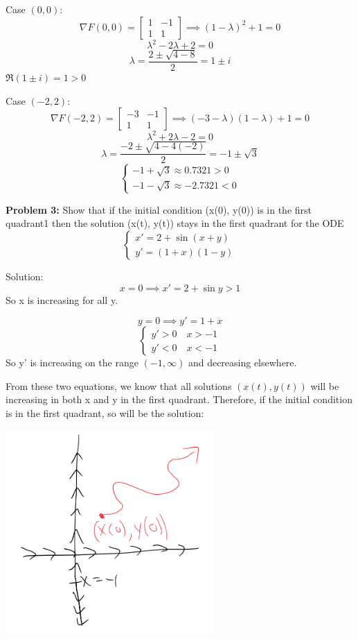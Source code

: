 \documentclass[12pt]{article}
\begin{document}
Case $(0, 0)$:
\[\nabla F(0, 0) = \begin{bmatrix}
    1 & -1\\
    1 & 1
\end{bmatrix} \implies (1- \lambda)^2 + 1 = 0\]
\[\lambda^2 - 2\lambda + 2 = 0\]
\[\lambda = \frac{2 \pm \sqrt{4 - 8}}{2} = 1 \pm i\]
$\Re (1 \pm i) = 1 > 0$ 

Case $(-2, 2)$:
\[\nabla F(-2, 2) = \begin{bmatrix}
    -3 & -1\\
    1 & 1
\end{bmatrix} \implies (-3 - \lambda)(1 - \lambda) + 1 = 0\]
\[\lambda^2 + 2\lambda - 2 = 0\]
\[\lambda = \frac{-2 \pm \sqrt{4 - 4(-2)}}{2} = -1 \pm \sqrt{3}\]
\[\begin{cases}
    -1 + \sqrt{3} \approx 0.7321 > 0\\
    -1 - \sqrt{3} \approx -2.7321 < 0
\end{cases}\]

\pagebreak 

\textbf{Problem 3:} Show that if the initial condition (x(0), y(0)) is in the first quadrant1
then the solution (x(t), y(t)) stays in the first quadrant for the ODE 
\[\begin{cases}
    x' = 2 + \sin (x + y)\\
    y' = (1 + x)(1 - y)
\end{cases}\]

Solution:
\[x = 0 \implies x' =  2 + \sin y > 1\]
So x is increasing for all y.

\[y = 0 \implies y' = 1 + x\]
\[\begin{cases}
    y' > 0 \quad x > -1\\
    y' < 0 \quad x < -1
\end{cases}\]
So y' is increasing on the range $(-1, \infty)$ and decreasing elsewhere. 

From these two equations, we know that all solutions $(x(t), y(t))$ will be increasing in both x and y in the first quadrant. Therefore, if the initial condition is in the first quadrant, so will be the solution:
\begin{center}
    \includegraphics[width=0.6\textwidth]{Images/nullclines.png}
\end{center}
\end{document}
